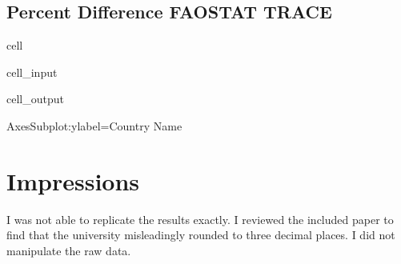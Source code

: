 \documentclass[letterpaper,10pt,english]{jupyterBook}
\begin{document}
\subsection{Percent Difference FAOSTAT \sphinxhyphen{} TRACE}
\label{\detokenize{notebooks/replicating_paper:id13}}
\begin{sphinxuseclass}{cell}\begin{sphinxVerbatimInput}

\begin{sphinxuseclass}{cell_input}
\begin{sphinxVerbatim}[commandchars=\\\{\}]
        \PYG{p}{[}\PYG{p}{]}       
\end{sphinxVerbatim}

\end{sphinxuseclass}\end{sphinxVerbatimInput}
\begin{sphinxVerbatimOutput}

\begin{sphinxuseclass}{cell_output}
\begin{sphinxVerbatim}[commandchars=\\\{\}]
\PYGZlt{}AxesSubplot:ylabel=\PYGZsq{}Country Name\PYGZsq{}\PYGZgt{}
\end{sphinxVerbatim}

\noindent{}

\end{sphinxuseclass}\end{sphinxVerbatimOutput}

\end{sphinxuseclass}

\section{Impressions}
\label{\detokenize{notebooks/replicating_paper:impressions}}
\sphinxAtStartPar
I was not able to replicate the results exactly.  I reviewed the included paper to find that the university misleadingly rounded to three decimal places.  I did not manipulate the raw data.
\end{document}

